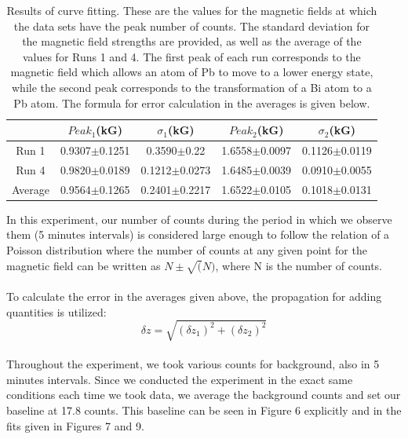 \begin{table}[H]
\begin{center}
\begin{tabular}{|c|c|c|c|c|}\hline
&$Peak_1$(kG) &$\sigma_1$(kG)&$Peak_2$(kG) &$\sigma_2$(kG)  \\ \hline
Run 1 &0.9307$\pm$0.1251 & 0.3590$\pm$0.22 & 1.6558$\pm$0.0097 &0.1126$\pm$0.0119 \\ \hline
Run 4 &0.9820$\pm$0.0189 &0.1212$\pm$0.0273 &1.6485$\pm$0.0039 &0.0910$\pm$0.0055\\ \hline
Average &0.9564$\pm$0.1265 &0.2401$\pm$0.2217 &1.6522$\pm$0.0105 &0.1018$\pm$0.0131 \\ \hline
\end{tabular}
\caption{Results of curve fitting. These are the values for the magnetic fields at which the data sets have the peak number of counts. The standard deviation for the magnetic field strengths are provided, as well as the average of the values for Runs 1 and 4. The first peak of each run corresponds to the magnetic field which allows an atom of Pb to move to a lower energy state, while the second peak corresponds to the transformation of a Bi atom to a Pb atom. The formula for error calculation in the averages is given below.}
\end{center}
\end{table}
In this experiment, our number of counts during the period in which we observe them (5 minutes intervals) is considered large enough to follow the relation of a Poisson distribution where the number of counts at any given point for the magnetic field can be written as $N\pm \sqrt(N)$, where N is the number of counts.\\ \\
To calculate the error in the averages given above, the propagation for adding quantities is utilized:
\begin{equation} \delta z=\sqrt{(\delta z_1)^2 + (\delta z_2)^2} \end {equation}
\\
Throughout the experiment, we took various counts for background, also in 5 minutes intervals. Since we conducted the experiment in the exact same conditions each time we took data, we average the background counts and set our baseline at 17.8 counts. This baseline can be seen in Figure 6 explicitly and in the fits given in Figures 7 and 9. 


